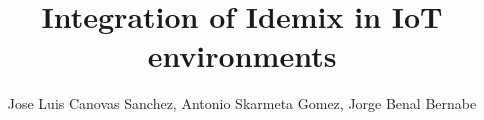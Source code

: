 \documentclass[journal]{IEEEtran}
\begin{document}
%
\title{Integration of Idemix in IoT environments}
%
%
%

\author{Jose Luis Canovas Sanchez, Antonio Skarmeta Gomez, Jorge Benal Bernabe}%

% 
%



% 
\end{document}
